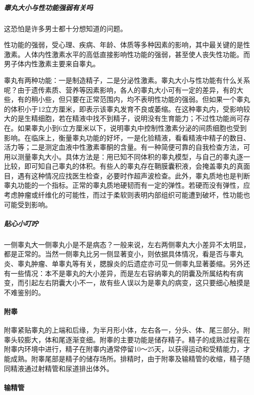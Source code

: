 \subparagraph{睾丸大小与性功能强弱有关吗}

这恐怕是许多男士都十分想知道的问题。

性功能的强弱，受心理、疾病、年龄、体质等多种因素的影响，其中最关键的是性激素。人体内性激素水平的高低直接影响性功能的强弱，甚至使人丧失性功能。而男子体内性激素主要来自睾丸。

睾丸有两种功能：一是制造精子，二是分泌性激素。睾丸大小与性功能有什么关系呢？由于遗传素质、营养等因素影响，各人的睾丸大小可有一定的差异，有的大些，有的稍小些，但只要在正常范围内，均不表明性功能的强弱。但如果一个睾丸的体积小于12立方厘米，即表示该睾丸发育不良或萎缩。在这种睾丸内，受影响较大的是生精细胞，若在精液中找不到精子，说明没有生育能力；不过性功能尚可存在。如果睾丸小到6立方厘米以下，说明睾丸中控制性激素分泌的间质细胞也受到影响。在临床上，衡量睾丸功能的好坏，一是化验精液，看看精液中精子的数目、活力等；二是测定血液中性激素睾酮的含量。有一种简便可靠的自我检查方法，可用以测量睾丸大小。具体方法是：用已知不同体积的睾丸模型，与自己的睾丸逐一比较，即可知自己睾丸的体积。有些人的睾丸存在鞘膜囊积液，会掩盖睾丸的真面目，遇有这种情况应找医生检查，必要时作超声波检查。此外，睾丸质地也是判断睾丸功能的一个指标。正常的睾丸质地硬韧而有一定的弹性。若硬而没有弹性，应考虑肿瘤或纤维化的可能性，而过于柔软则表明内部组织可能遭到破坏，性功能也可能受到影响。

\subparagraph{贴心小叮咛}

一侧睾丸大一侧睾丸小是不是病态？一般来说，左右两侧睾丸大小差异不太明显，都是正常的。当然一侧睾丸比另一侧显著变小，则依据具体情况，看是否与睾丸炎、睾丸肿瘤、单睾丸等有关，腮腺炎的后遗症亦可见一侧睾丸显著萎缩。另外还有一些情况：本不是睾丸的大小差异，而是左右容纳睾丸的阴囊及所属结构有病变，而引起左右阴囊大小不一，故有些人误以为是睾丸的病变，这只要细心触摸是不难鉴别的。

\paragraph{附睾}

附睾紧贴睾丸的上端和后缘，为半月形小体，左右各一，分头、体、尾三部分。附睾头较膨大，体和尾逐渐变细。附睾的主要功能是储存精子。精子的成熟过程需在附睾内环境中进行，精子在附睾内通常停留10～25天，以获得运动和受精能力，才能成熟。附睾尾部是精子的储存场所。排精时，由于附睾及输精管的收缩，精子随同精液通过射精管和尿道排出体外。

\paragraph{输精管}

